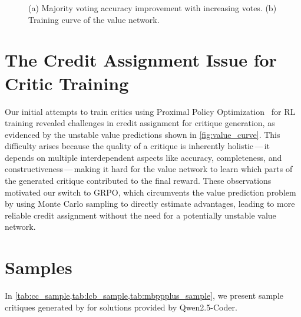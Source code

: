 \begin{figure}[ht]
    \centering
    \hfill
    \caption{(a) Majority voting accuracy improvement with increasing votes. (b) Training curve of the value network.}
    \label{fig:combined_figures}
\end{figure}

\section{The Credit Assignment Issue for Critic Training}\label{appendix:credit_assignment}
Our initial attempts to train critics using Proximal Policy Optimization~\cite{schulman2017proximal} for RL training revealed challenges in credit assignment for critique generation, as evidenced by the unstable value predictions shown in \cref{fig:value_curve}. This difficulty arises because the quality of a critique is inherently holistic\,---\,it depends on multiple interdependent aspects like accuracy, completeness, and constructiveness\,---\,making it hard for the value network to learn which parts of the generated critique contributed to the final reward. These observations motivated our switch to GRPO, which circumvents the value prediction problem by using Monte Carlo sampling to directly estimate advantages, leading to more reliable credit assignment without the need for a potentially unstable value network.

\section{{\ours} Samples}\label{appendix:samples}
In \cref{tab:cc_sample,tab:lcb_sample,tab:mbppplus_sample}, we present sample critiques generated by {\ours} for solutions provided by Qwen2.5-Coder.



\renewcommand{\arraystretch}{1.4} %


